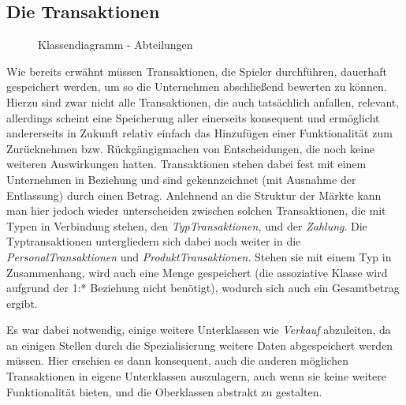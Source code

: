 \subsection{Die Transaktionen}
\begin{figure}[htb]
     \centering
     \caption{Klassendiagramm - Abteilungen}
     \label{img:fachkonzept-entwurf-abteilung}
\end{figure}
Wie bereits erwähnt müssen Transaktionen, die Spieler durchführen, dauerhaft gespeichert werden, um so die Unternehmen abschließend bewerten zu können. Hierzu sind zwar nicht alle Transaktionen, die auch tatsächlich anfallen, relevant, allerdings scheint eine Speicherung aller einerseits konsequent und ermöglicht andererseits in Zukunft relativ einfach das Hinzufügen einer Funktionalität zum Zurücknehmen bzw. Rückgängigmachen von Entscheidungen, die noch keine weiteren Auswirkungen hatten. Transaktionen stehen dabei fest mit einem Unternehmen in Beziehung und sind gekennzeichnet (mit Ausnahme der Entlassung) durch einen Betrag. Anlehnend an die Struktur der Märkte kann man hier jedoch wieder unterscheiden zwischen solchen Transaktionen, die mit Typen in Verbindung stehen, den \textit{TypTransaktionen}, und der \textit{Zahlung}. Die Typtransaktionen untergliedern sich dabei noch weiter in die \textit{PersonalTransaktionen} und \textit{ProduktTransaktionen}. Stehen sie mit einem Typ in Zusammenhang, wird auch eine Menge gespeichert (die assoziative Klasse wird aufgrund der 1:* Beziehung nicht benötigt), wodurch sich auch ein Gesamtbetrag ergibt.

Es war dabei notwendig, einige weitere Unterklassen wie \textit{Verkauf} abzuleiten, da an einigen Stellen durch die Spezialisierung weitere Daten abgespeichert werden müssen. Hier erschien es dann konsequent, auch die anderen möglichen Transaktionen in eigene Unterklassen auszulagern, auch wenn sie keine weitere Funktionalität bieten, und die Oberklassen abstrakt zu gestalten.

